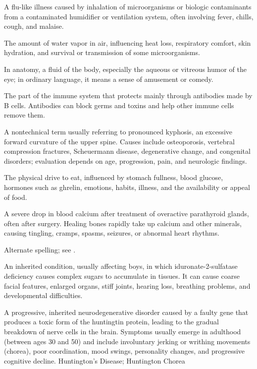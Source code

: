  A flu-like illness caused by inhalation of microorganisms or biologic contaminants from a contaminated humidifier or ventilation system, often involving fever, chills, cough, and malaise.

 The amount of water vapor in air, influencing heat loss, respiratory comfort, skin hydration, and survival or transmission of some microorganisms.

 In anatomy, a fluid of the body, especially the aqueous or vitreous humor of the eye; in ordinary language, it means a sense of amusement or comedy.

 The part of the immune system that protects mainly through antibodies made by B cells. Antibodies can block germs and toxins and help other immune cells remove them.

 A nontechnical term usually referring to pronounced kyphosis, an excessive forward curvature of the upper spine. Causes include osteoporosis, vertebral compression fractures, Scheuermann disease, degenerative change, and congenital disorders; evaluation depends on age, progression, pain, and neurologic findings.

 The physical drive to eat, influenced by stomach fullness, blood glucose, hormones such as ghrelin, emotions, habits, illness, and the availability or appeal of food.

 A severe drop in blood calcium after treatment of overactive parathyroid glands, often after surgery. Healing bones rapidly take up calcium and other minerals, causing tingling, cramps, spasms, seizures, or abnormal heart rhythms.

 Alternate spelling; see .

 An inherited condition, usually affecting boys, in which iduronate-2-sulfatase deficiency causes complex sugars to accumulate in tissues. It can cause coarse facial features, enlarged organs, stiff joints, hearing loss, breathing problems, and developmental difficulties.

 A progressive, inherited neurodegenerative disorder caused by a faulty gene that produces a toxic form of the huntingtin protein, leading to the gradual breakdown of nerve cells in the brain. Symptoms usually emerge in adulthood (between ages 30 and 50) and include involuntary jerking or writhing movements (chorea), poor coordination, mood swings, personality changes, and progressive cognitive decline.
\synonyms
Huntington's Disease; Huntington Chorea

